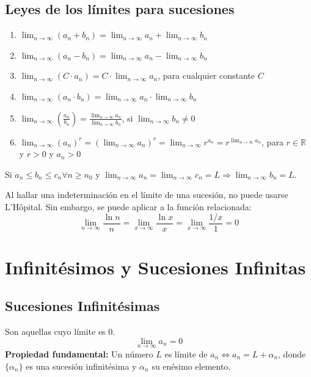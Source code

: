 \documentclass[a4paper,12pt]{article}
\begin{document}
\subsection{Leyes de los límites para sucesiones}
\begin{enumerate}
    \item $\lim_{n \to \infty} (a_n + b_n) = \lim_{n \to \infty} a_n + \lim_{n \to \infty} b_n$
    \item $\lim_{n \to \infty} (a_n - b_n) = \lim_{n \to \infty} a_n - \lim_{n \to \infty} b_n$
    \item $\lim_{n \to \infty} (C \cdot a_n) = C \cdot \lim_{n \to \infty} a_n$, para cualquier constante $C$
    \item $\lim_{n \to \infty} (a_n \cdot b_n) = \lim_{n \to \infty} a_n \cdot \lim_{n \to \infty} b_n$
    \item $\lim_{n \to \infty} \left(\frac{a_n}{b_n}\right) = \frac{\lim_{n \to \infty} a_n}{\lim_{n \to \infty} b_n}$, si $\lim_{n \to \infty} b_n \neq 0$
    \item $\lim_{n \to \infty} (a_n)^r = \left(\lim_{n \to \infty} a_n\right)^r = \lim_{n \to \infty} r^{a_n} = r^{\lim_{n \to \infty} a_n}$, para $r \in \mathbb{R}$ y $r > 0$ y $a_n > 0$
\end{enumerate}

\begin{tcolorbox}[title=Teorema de compresión,colback=blue!5!white,colframe=blue!75!black]
    Si $a_n \leqslant b_n \leqslant c_n \forall n \geqslant n_0$ y $\lim_{n \to \infty} a_n = \lim_{n \to \infty} c_n = L \Rightarrow \lim_{n \to \infty} b_n = L$.
\end{tcolorbox}

\begin{tcolorbox}[title=Teorema de compresión,colback=blue!5!white,colframe=blue!75!black]
    Al hallar una indeterminación en el límite de una sucesión, no puede usarse L'Hôpital. Sin embargo, se puede aplicar a la función relacionada:
    $$ \lim_{n \to \infty} \frac{\ln n}{n} = \lim_{x \to \infty} \frac{\ln x}{x} = \lim_{x \to \infty} \frac{1/x}{1} = 0 $$
\end{tcolorbox}

\section{Infinitésimos y Sucesiones Infinitas}

\subsection{Sucesiones Infinitésimas}
Son aquellas cuyo límite es 0.
$$ \lim_{n \to \infty} a_n = 0 $$
\textbf{Propiedad fundamental:} Un número $L$ es límite de $a_n \Leftrightarrow a_n = L + \alpha_n$, donde $\{\alpha_n\}$ es una sucesión infinitésima y $\alpha_n$ su enésimo elemento.
\end{document}
